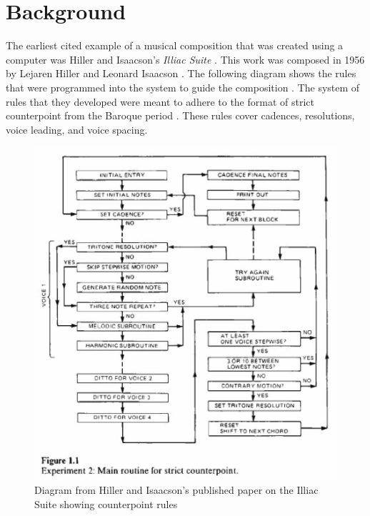 \section{Background}
\label{sec:background}

The earliest cited example of a musical composition that was created using a computer was Hiller and Isaacson's \textit{Illiac Suite} \cite{Fernandez_2013}.  This work was composed in 1956 by Lejaren Hiller and Leonard Isaacson \cite{Brit_2018}.  The following diagram shows the rules that were programmed into the system to guide the composition \cite{Hiller_1992}.  The system of rules that they developed were meant to adhere to the format of strict counterpoint from the Baroque period \cite{Hiller_1992}.  These rules cover cadences, resolutions, voice leading, and voice spacing.

\begin{figure}[!htbp]
	\centering
	\caption{Diagram from Hiller and Isaacson's published paper on the Illiac Suite showing counterpoint rules \cite{Hiller_1992}}
	\includegraphics[width=\textwidth]{images/illiacChart}
\end{figure}

\pagebreak

